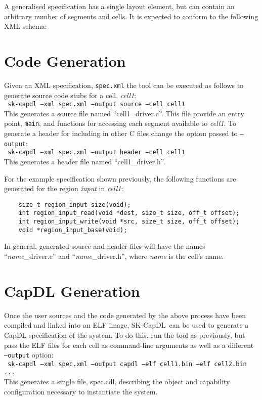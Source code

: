 \documentclass[a4paper,11pt,twoside]{report}
\newcommand{\skcapdl}{SK-CapDL}
\newcommand{\skentity}[1]{\emph{#1}}
\newcommand{\code}[1]{\\[+4pt]
{{\tt \hphantom{    } #1}}\\[+4pt]
}
\begin{document}
A generalised specification has a single layout element, but can contain an
arbitrary number of segments and cells.
It is expected to conform to the following XML schema:
\vspace{6pt}
{\lstset{language=xml,frame=single,basicstyle=\ttfamily\small}}

  \section{\label{sec:codegen}Code Generation}
Given an XML specification, {\tt spec.xml} the tool can be executed as follows
to generate source code stubs for a cell, \skentity{cell1}:
\code{
    sk-capdl --xml spec.xml --output source --cell cell1
}
This generates a source file named ``cell1\_driver.c''.
This file provide an entry point, {\tt main}, and functions for accessing
each segment available to \skentity{cell1}.
To generate a header for including in other C files change the option passed to
{\tt --output}:
\code{
    sk-capdl --xml spec.xml --output header --cell cell1
}
This generates a header file named ``cell1\_driver.h''.

For the example specification shown previously, the following functions are
generated for the region \skentity{input} in \skentity{cell1}:
\begin{lstlisting}
    size_t region_input_size(void);
    int region_input_read(void *dest, size_t size, off_t offset);
    int region_input_write(void *src, size_t size, off_t offset);
    void *region_input_base(void);
\end{lstlisting}
In general, generated
source and header files will have the names ``{\it name}\_driver.c'' and
``{\it name}\_driver.h'', where {\it name} is the cell's name.

  \section{\label{sec:capdlgen}CapDL Generation}
Once the user sources and the code generated by the above process have been
compiled and linked into an ELF image, \skcapdl~can be used to generate a CapDL
specification of the system.
To do this, run the tool as previously, but pass the ELF files for each cell as
command-line arguments as well as a different {\tt --output} option:
\code{
    sk-capdl --xml spec.xml --output capdl --elf cell1.bin --elf cell2.bin ...
}
This generates a single file, spec.cdl, describing the object and capability
configuration necessary to instantiate the system.
\end{document}
